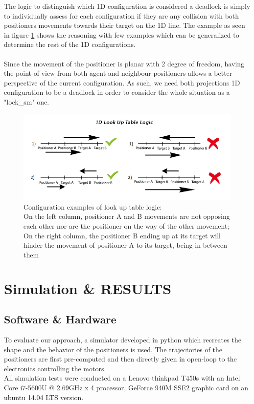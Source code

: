 \documentclass[]{spie}  %
\begin{document}
	The logic to distinguish which 1D configuration is considered a deadlock is simply to individually assess for each configuration if they are any collision with both positioners movements towards their target on the 1D line. The example as seen in figure \ref{look_UpTableLogic} shows the reasoning with few examples which can be generalized to determine the rest of the 1D configurations.\\\\
	Since the movement of the positioner is planar with 2 degree of freedom, having the point of view from both agent and neighbour positioners allows a better perspective of the current configuration. As such, we need both projections 1D configuration to be a deadlock in order to consider the whole situation as a "lock\_sm" one.  
	\begin{figure}[H]
		\centering
		\includegraphics[scale=0.55]{images/1DLookUpTable.jpg}
		\caption{\centering
			 Configuration examples of look up table logic:\\
			On the left column, positioner A and B movements are not opposing each other nor are the positioner on the way of the other movement; 
			On the right column,  the positioner B ending up at its target will hinder the movement of positioner A to its target, being in between them }
		\label{look_UpTableLogic}
	\end{figure}
	\section{Simulation \& RESULTS}
	\label{RESULTS}
	\subsection{Software \& Hardware}
	\label{Software Hardware}
	To evaluate our approach, a simulator developed in python which recreates the shape and the behavior of the positioners is used. The trajectories of the positioners are first pre-computed and then directly given in open-loop to the electronics controlling the motors.\\  
	All simulation tests were conducted on a Lenovo thinkpad T450s with an Intel Core i7-5600U @ 2.69GHz x 4 processor, GeForce 940M SSE2 graphic card on an ubuntu 14.04 LTS version.
\end{document}
